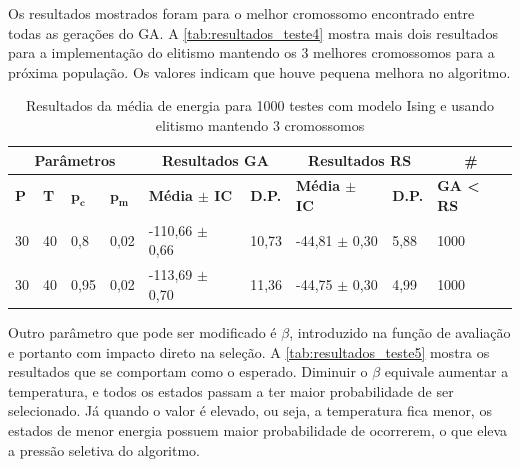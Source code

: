 Os resultados mostrados foram para o melhor cromossomo encontrado entre todas as gerações do GA. A \autoref{tab:resultados_teste4} mostra mais dois resultados para a implementação do elitismo mantendo os 3 melhores cromossomos para a próxima população. Os valores indicam que houve pequena melhora no algoritmo.

\begin{table}[h!]
	\centering
	\begin{tabular}{|l|l|l|l|l|l|l|l|l|}
		\hline
		\multicolumn{4}{|c|}{\textbf{Parâmetros}}                                                    & \multicolumn{2}{c|}{\textbf{Resultados GA}}                                        & \multicolumn{2}{c|}{\textbf{Resultados RS}}                                        & \multicolumn{1}{c|}{\textbf{\#}}                      \\ \hline
		\textbf{P} & \textbf{T} & $\bm{p_c}$ & $\bm{p_m}$ & \textbf{Média $\pm$ IC} & \textbf{D.P.} & \textbf{Média $\pm$ IC} & \textbf{D.P.} & \textbf{GA < RS} \\ \hline
		30                          & 40                          & 0,8        & 0,02       & -110,66 $\pm$ 0,66                           & 10,73                          & -44,81 $\pm$ 0,30                            & 5,88                           & 1000                                      \\ \hline
		30                          & 40                          & 0,95        & 0,02       & -113,69 $\pm$ 0,70                            & 11,36                          & -44,75 $\pm$ 0,30                            & 4,99                           & 1000                                      \\ \hline
	\end{tabular}
	\caption{Resultados da média de energia para 1000 testes com modelo Ising e usando elitismo mantendo 3 cromossomos}
	\label{tab:resultados_teste4}
\end{table}

Outro parâmetro que pode ser modificado é \(\beta\), introduzido na função de avaliação e portanto com impacto direto na seleção. A \autoref{tab:resultados_teste5} mostra os resultados que se comportam como o esperado. Diminuir o \(\beta\) equivale aumentar a temperatura, e todos os estados passam a ter maior probabilidade de ser selecionado. Já quando o valor é elevado, ou seja, a temperatura fica menor, os estados de menor energia possuem maior probabilidade de ocorrerem, o que eleva a pressão seletiva do algoritmo. 

